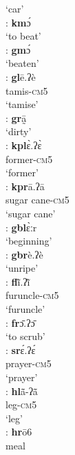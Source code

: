 \documentclass[output=paper]{langscibook}
\begin{document}
\begin{exe}
\begin{multicols}{2}
\begin{xlisti}
           {}  `car'\\
        \ex \gll [km]:      \textbf{km}ɔ́\\
            {}      {`to beat'}\\
        \ex \gll [gm]:      \textbf{gm}ɔ́\\
            {}      `beaten'\\
        \ex \glll [gl]:       \textbf{gl}ē.ʔè\\
            {}          tamis-\textsc{cm}5\\
            {} ‘tamise’\\
        \ex \gll [gr]:       \textbf{gr}ā̰  \\
            {}      `dirty'\\
        \ex  \glll [kpl]:      \textbf{kpl}ɛ̀.ʔɛ̀ \\
            {}          former-\textsc{cm}5\\
            {}          `former'\\
        \ex \glll [kpr]:     \textbf{kpr}ā.ʔā\\
            {}          {sugar cane-\textsc{cm}5}\\
            {} {`sugar cane'}\\
        \ex \gll [gbl]:     \textbf{gbl}ɛ̀ːr\\
            {}          `beginning'\\
        \ex \gll [gbr]:     \textbf{gbr}è.ʔè\\
            {}          `unripe'\\
        \ex \glll [fl]: \textbf{fl}ĩ̀.ʔĩ̀  \\
            {} furuncle-\textsc{cm}5\\
            {} `furuncle'\\
        \ex \gll [fr]:        \textbf{fr}ɔ̄.ʔɔ̄ \\
            {} {`to scrub'}\\
        \ex \glll [sr]:        \textbf{sr}ɛ́.ʔɛ́\\
            {}      prayer-\textsc{cm}5\\
            {}      `prayer'\\
        \ex \glll [hl]:   \textbf{hl}ã̄-ʔã̄\\
            {} leg-\textsc{cm}5\\
            {} `leg'\\
        \ex \glll [hr]:      \textbf{hr}ō6\\
                {}          meal\\

\end{xlisti}
\end{multicols}
\end{exe}
\end{document}
